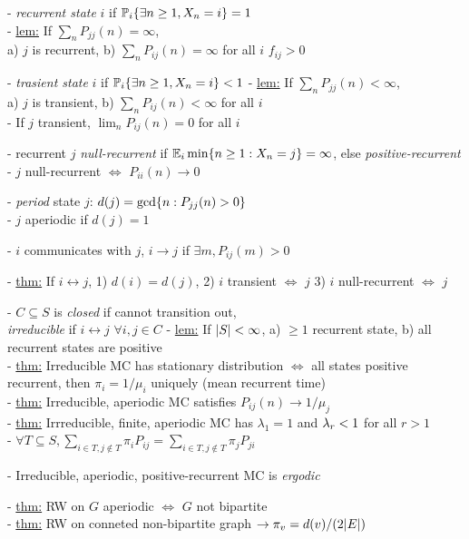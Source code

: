 \documentclass[10pt]{article}
\DeclarePairedDelimiter{\set}{\lbrace}{\rbrace}
\DeclarePairedDelimiter{\card}{\lvert}{\rvert}
\let\abs\relax
\DeclarePairedDelimiter{\abs}{\lvert}{\rvert}
\newcommand{\E}{\mathbb{E}}
\renewcommand{\P}{\mathbb{P}}
\newcommand{\sset}{\subseteq}
\begin{document}
\begin{multicols}{3}
- \emph{recurrent state} $i$ if $\P_i\set{\exists n\geq 1, X_n=i} = 1$ \\
- \underline{lem:} If $\sum_n P_{jj}(n) = \infty$, \\
a) $j$ is recurrent,
b) $\sum_n P_{ij}(n) = \infty$ for all $i$ $f_{ij} > 0$

- \emph{trasient state} $i$ if $\P_i\set{\exists n\geq 1, X_n=i} < 1$
- \underline{lem:} If $\sum_n P_{jj}(n) < \infty$, \\
a) $j$ is transient,
b) $\sum_n P_{ij}(n) < \infty$ for all $i$ \\
- If $j$ transient,
$\lim_n P_{ij}(n) = 0$ for all $i$

- recurrent $j$ \emph{null-recurrent} if $\E_i \min\set{n\geq 1: X_n=j} = \infty$,
else \emph{positive-recurrent} \\
- $j$ null-recurrent $\iff$ $P_{ii}(n)\to 0$

- \emph{period} state $j$:
$d(j) = \gcd\set{n: P_{jj}(n) > 0}$ \\
- $j$ aperiodic if $d(j) = 1$

- $i$ communicates with $j$,
$i\to j$ if $\exists m, P_{ij}(m) > 0$

- \underline{thm:} If $i\leftrightarrow j$,
1) $d(i) = d(j)$,
2) $i$ transient $\iff$ $j$
3) $i$ null-recurrent $\iff$ $j$

- $C\sset S$ is \emph{closed} if cannot transition out, \\
\emph{irreducible} if $i\leftrightarrow j$ $\forall i, j\in C$
- \underline{lem:} If $\card S < \infty$,
a) $\geq 1$ recurrent state,
b) all recurrent states are positive \\
- \underline{thm:} Irreducible MC has stationary distribution
$\iff$ all states positive recurrent,
then $\pi_i = 1/\mu_i$ uniquely (mean recurrent time) \\
- \underline{thm:} Irreducible, aperiodic MC satisfies $P_{ij}(n)\to 1/\mu_j$ \\
- \underline{thm:} Irrreducible, finite, aperiodic MC
has $\lambda_1 = 1$ and $\abs{\lambda_r} < 1$ for all $r > 1$ \\
- $\forall T\sset S,
\sum_{i\in T, j\notin T} \pi_i P_{ij}
= \sum_{i\in T, j\notin T} \pi_j P_{ji}$

- Irreducible, aperiodic, positive-recurrent MC is \emph{ergodic}

- \underline{thm:} RW on $G$ aperiodic $\iff$ $G$ not bipartite \\
- \underline{thm:} RW on conneted non-bipartite graph $\to \pi_v = d(v) / (2\card E)$


\end{multicols}
\end{document}
